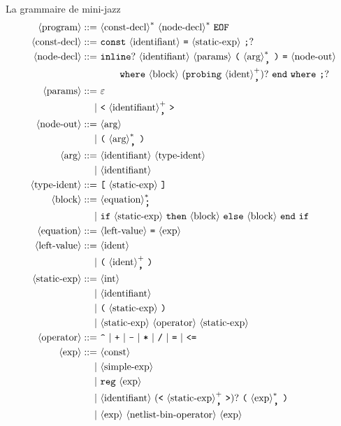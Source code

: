 \documentclass[a4paper]{article}
\DeclarePairedDelimiter{\scal}{\langle}{\rangle}
\newcommand{\nt}[1]{\ \scal*{\text{#1}}}
\newcommand{\te}[1]{\ \text{\texttt{#1}}}
\newcommand{\ite}[1]{\ \text{\texttt{#1}}\ }
\newcommand{\ste}[1]{\text{\large \texttt{#1}}}
\begin{document}
\noindent
La grammaire de mini-jazz
\begin{align*}
    \nt{program} ::= & \nt{const-decl}^* \nt{node-decl}^* \te{EOF} \\
    \nt{const-decl} ::= & \te{const} \nt{identifiant} \te{=} \nt{static-exp} \te{;}? \\
    \nt{node-decl} ::= & \te{inline}? \nt{identifiant} \nt{params} \te{(} \nt{arg}^*_\ste{,} \te{)} \te{=} \nt{node-out} \\
    & \qquad \te{where} \nt{block} \ (\!\!\te{probing} \nt{ident}^+_\ste{,})? \te{end} \te{where} \te{;}? \\
%
    \nt{params} ::= & \ \varepsilon \\
    | & \te{<} \nt{identifiant}^+_\ste{,} \te{>} \\
    \nt{node-out} ::= & \nt{arg} \\
    | & \te{(} \nt{arg}^*_\ste{,} \te{)} \\
    \nt{arg} ::= & \nt{identifiant} \nt{type-ident} \\
    | & \nt{identifiant} \\
    \nt{type-ident} ::= & \te{[} \nt{static-exp} \te{]} \\
%
    \nt{block} ::= & \nt{equation}^*_\ste{;} \\
    | & \te{if} \nt{static-exp} \te{then} \nt{block} \te{else} \nt{block} \te{end} \te{if} \\
    \nt{equation} ::= & \nt{left-value} \te{=} \nt{exp} \\
    \nt{left-value} ::= & \nt{ident} \\
    | & \te{(} \nt{ident}^+_\ste{,} \te{)} \\
%
    \nt{static-exp} ::= & \nt{int} \\
    | & \nt{identifiant} \\
    | & \te{(} \nt{static-exp} \te{)} \\
    | & \nt{static-exp} \nt{operator} \nt{static-exp} \\
    \nt{operator} ::= & \ite{\textasciicircum} | \ite{+} | \ite{-} | \ite{*} | \ite{/} | \ite{=} | \ite{<=} \\
%
    \nt{exp} ::= & \nt{const} \\
    | & \nt{simple-exp} \\
    | & \te{reg} \nt{exp} \\
    | & \nt{identifiant}\ (\!\!\te{<} \nt{static-exp}^+_\ste{,} \te{>})? \te{(} \nt{exp}^*_\ste{,} \te{)} \\
    | & \nt{exp} \nt{netlist-bin-operator} \nt{exp} \\

\end{align*}
\end{document}
